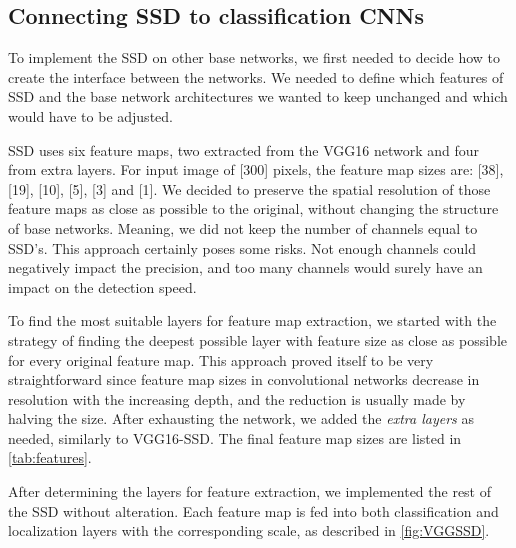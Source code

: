 \subsection{Connecting SSD to classification CNNs}
To implement the SSD on other base networks, we first needed to decide how to create the interface between the networks. We needed to define which features of SSD and the base network architectures we wanted to keep unchanged and which would have to be adjusted.

SSD uses six feature maps, two extracted from the VGG16 network and four from extra layers. For input image of [300] pixels, the feature map sizes are: [38], [19], [10], [5], [3] and [1]. We decided to preserve the spatial resolution of those feature maps as close as possible to the original, without changing the structure of base networks. Meaning, we did not keep the number of channels equal to SSD's. This approach certainly poses some risks. Not enough channels could negatively impact the precision, and too many channels would surely have an impact on the detection speed.

To find the most suitable layers for feature map extraction, we started with the strategy of finding the deepest possible layer with feature size as close as possible for every original feature map. This approach proved itself to be very straightforward since feature map sizes in convolutional networks decrease in resolution with the increasing depth, and the reduction is usually made by halving the size. After exhausting the network, we added the \textit{extra layers} as needed, similarly to VGG16-SSD. The final feature map sizes are listed in \cref{tab:features}. 

After determining the layers for feature extraction, we implemented the rest of the SSD without alteration. Each feature map is fed into both classification and localization layers with the corresponding scale, as described in \cref{fig:VGGSSD}. 

